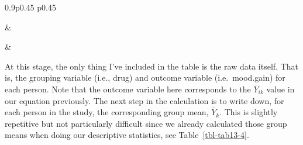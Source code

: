 \documentclass[
  a4paper,
]{book}
\begin{document}
\begin{table}[ht]
\begin{centerbox}
\begin{threeparttable}
\begin{tabularx}{0.9\textwidth}{p{} p{}}
\hhline{}

 &
 \tabularnewline[-0.5pt]


\hhline{}

 &
 \tabularnewline[-0.5pt]


\end{tabularx} 

\end{threeparttable}\par\end{centerbox}

\end{table}
 

At this stage, the only thing I've included in the table is the raw data
itself. That is, the grouping variable (i.e., drug) and outcome variable
(i.e.~mood.gain) for each person. Note that the outcome variable here
corresponds to the \(\bar{Y}_{ik}\) value in our equation previously.
The next step in the calculation is to write down, for each person in
the study, the corresponding group mean, \(\bar{Y}_k\). This is slightly
repetitive but not particularly difficult since we already calculated
those group means when doing our descriptive statistics, see
Table~\ref{tbl-tab13-4}.

\hypertarget{tbl-tab13-4}{}
 
  \providecommand{\huxb}[2]{\arrayrulecolor[RGB]{#1}\global\arrayrulewidth=#2pt}
  \providecommand{\huxvb}[2]{\color[RGB]{#1}\vrule width #2pt}
  \providecommand{\huxtpad}[1]{\rule{0pt}{#1}}
  \providecommand{\huxbpad}[1]{\rule[-#1]{0pt}{#1}}
\end{document}
